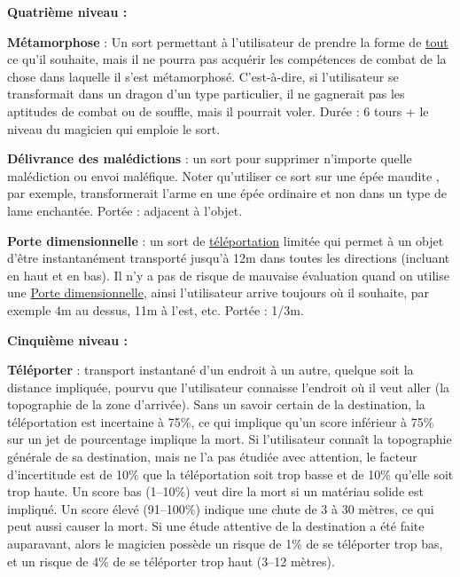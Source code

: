 \bigskip

\textbf{Quatrième niveau :}

\bigskip

\label{sort-metamorphose}\textbf{Métamorphose} : Un sort permettant à l'utilisateur de prendre la forme de \underline{tout} ce qu'il souhaite, mais il ne pourra pas acquérir les compétences de combat de la chose dans laquelle il s'est métamorphosé. C'est-à-dire, si l'utilisateur se transformait dans un dragon d'un type particulier, il ne gagnerait pas les aptitudes de combat ou de souffle, mais il pourrait voler. Durée : 6 tours + le niveau du magicien qui emploie le sort.

\bigskip

\label{sort-delivrance-malediction}\textbf{Délivrance des malédictions} : un sort pour supprimer n'importe quelle malédiction ou envoi maléfique. Noter qu'utiliser ce sort sur une \og épée maudite \fg{}, par exemple, transformerait l'arme en une épée ordinaire et non dans un type de lame enchantée. Portée : adjacent à l'objet.

\bigskip

\label{sort-porte-dimensionnelle}\textbf{Porte dimensionnelle} : un sort de \uline{téléportation} limitée qui permet à un objet d'être instantanément transporté jusqu'à 12m dans toutes les directions (incluant en haut et en bas). Il n'y a pas de risque de mauvaise évaluation quand on utilise une \uline{Porte dimensionnelle}, ainsi l'utilisateur arrive toujours où il souhaite, par exemple 4m au dessus, 11m à l'est, etc. Portée : 1/3m.

\bigskip

\textbf{Cinquième niveau :}

\bigskip

\label{sort-teleporter}\textbf{Téléporter} : transport instantané d'un endroit à un autre, quelque soit la distance impliquée, pourvu que l'utilisateur connaisse l'endroit où il veut aller (la topographie de la zone d'arrivée). Sans un savoir certain de la destination, la téléportation est incertaine à 75\%, ce qui implique qu'un score inférieur à 75\% sur un jet de pourcentage implique la mort. Si l'utilisateur connaît la topographie générale de sa destination, mais ne l'a pas étudiée avec attention, le facteur d'incertitude est de 10\% que la téléportation soit trop basse et de 10\% qu'elle soit trop haute. Un score bas (1--10\%) veut dire la mort si un matériau solide est impliqué. Un score élevé (91--100\%) indique une chute de 3 à 30 mètres, ce qui peut aussi causer la mort. Si une étude attentive de la destination a été faite auparavant, alors le magicien possède un risque de 1\% de se téléporter trop bas, et un risque de 4\% de se téléporter trop haut (3--12 mètres).

